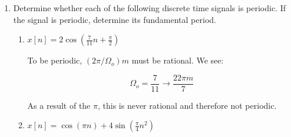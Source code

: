 \begin{enumerate}
\begin{enumerate}
        This gives us the fundamental period:

        $$\boxed{T=\frac{2\pi}{\pi}=2[\si{\second}]}$$

      \item $x(t)=2\left[ \sin\left( 50\pi t - \frac{\pi}{3} \right) \right]^2$

        The function is periodic, with angular frequency $\omega=50\pi\left[ \dfrac{\text{rad}}{\si{\second}} \right]$

        This gives us the fundamental period:

        $$\boxed{T=\frac{2\pi}{50\pi}=.04[\si{\second}]}$$

      \item $x(t)=\left\{\begin{array}{l r} 2\sin(5\pi t),\, & t\geq 0\\ -2\sin(-5\pi t),\, &t<0\end{array}$

        Per trigonometric identities, we know that:

        $$\sin(t)=-\sin(-t)$$

        Thus, the function presented is simply:

        $$x(t)=2\sin(5\pi t)$$

        This function is periodic, with angular frequency $\omega=5\pi\left[ \dfrac{\text{rad}}{\si{\second}} \right]$

        This gives us the fundamental period:

        $$\boxed{T=\frac{2\pi}{5\pi}=.4[\si{\second}]}$$

    \end{enumerate}

  \item Determine whether each of the following discrete time signals is periodic. If the signal is periodic, determine its fundamental period.

    \begin{enumerate}

      \item $x[n]=2\cos\left( \frac{7}{11}n+\frac{\pi}{2} \right)$

        To be periodic, $(2\pi/\Omega_o)m$ must be rational. We see:

        $$\Omega_o=\frac{7}{11}\to\frac{22\pi m}{7}$$

        As a result of the $\pi$, this is never rational and therefore not periodic.

      \item $x[n]=\cos(\pi n)+4\sin\left( \frac{\pi}{4}n^2 \right)$


\end{enumerate}
\end{enumerate}
